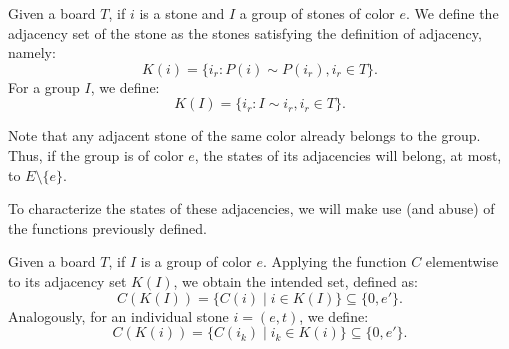 \begin{definition}
	Given a board $T$, if \(i\) is a stone and \(I\) a group of stones of color \(e\). We define the adjacency set of the stone as the stones satisfying the definition of adjacency, namely:
	$$K(i) = \{
	i_r : P(i) \sim P(i_r), i_r\in T
	\}.$$
	For a group $I$, we define:
	$$K(I) = \{i_r : I \sim i_r, i_r \in T \}.$$
\end{definition}


Note that any adjacent stone of the same color already belongs to the group. Thus, if the group is of color $e$, the states of its adjacencies will belong, at most, to $E \setminus \{e\}$.

To characterize the states of these adjacencies, we will make use (and abuse) of the functions previously defined.

\begin{definition}\label{def_estados}
	Given a board $T$, if $I$ is a group of color $e$. Applying the function $C$ elementwise to its adjacency set $K(I)$, we obtain the intended set, defined as:
	$$C(K(I)) = \{C(i) \mid i \in K(I)\} \subseteq \{0, e'\}.$$
	Analogously, for an individual stone $i = (e,t)$, we define:
	$$C(K(i)) = \{C(i_k) \mid i_k \in K(i)\} \subseteq \{0, e'\}.$$
	\end{definition}

